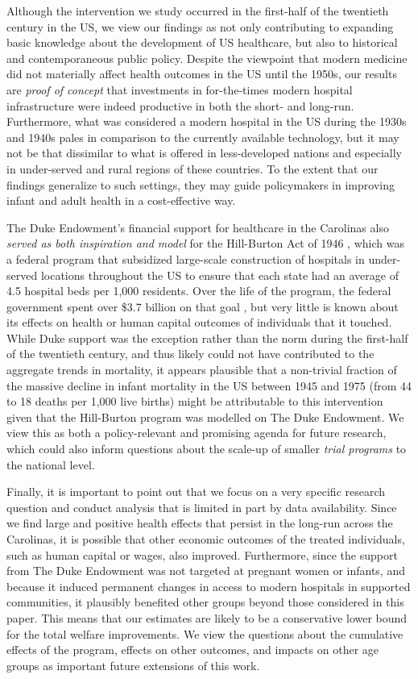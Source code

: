 \documentclass[12pt]{article}
\begin{document}
Although the intervention we study occurred in the first-half of the twentieth century in the US, we view our findings as not only contributing to expanding basic knowledge about the development of US healthcare, but also to historical and contemporaneous public policy.
Despite the viewpoint that modern medicine did not materially affect health outcomes in the US until the 1950s, our results are \emph{proof of concept} that investments in for-the-times modern hospital infrastructure were indeed productive in both the short- and long-run.
Furthermore, what was considered a modern hospital in the US during the 1930s and 1940s pales in comparison to the currently available technology, but it may not be that dissimilar to what is offered in less-developed nations and especially in under-served and rural regions of these countries.
To the extent that our findings generalize to such settings, they may guide policymakers in improving infant and adult health in a cost-effective way.

The Duke Endowment's financial support for healthcare in the Carolinas also \emph{served as both inspiration and model} for the Hill-Burton Act of 1946 , which was a federal program that subsidized large-scale construction of hospitals in under-served locations throughout the US to ensure that each state had an average of 4.5 hospital beds per 1,000 residents.
Over the life of the program, the federal government spent over \$3.7 billion on that goal , but very little is known about its effects on health or human capital outcomes of individuals that it touched.
While Duke support was the exception rather than the norm during the first-half of the twentieth century, and thus likely could not have contributed to the aggregate trends in mortality, it appears plausible that a non-trivial fraction of the massive decline in infant mortality in the US between 1945 and 1975 (from 44 to 18 deaths per 1,000 live births) might be attributable to this intervention given that the Hill-Burton program was modelled on The Duke Endowment.
We view this as both a policy-relevant and promising agenda for future research, which could also inform questions about the scale-up of smaller \emph{trial programs} to the national level.

Finally, it is important to point out that we focus on a very specific research question and conduct analysis that is limited in part by data availability. 
Since we find large and positive health effects that persist in the long-run across the Carolinas, it is possible that other economic outcomes of the treated individuals, such as human capital or wages, also improved. 
Furthermore, since the support from The Duke Endowment was not targeted at pregnant women or infants, and because it induced permanent changes in access to modern hospitals in supported communities, it plausibly benefited other groups beyond those considered in this paper. This means that our estimates are likely to be a conservative lower bound for the total welfare improvements. 
We view the questions about the cumulative effects of the program, effects on other outcomes, and impacts on other age groups as important future extensions of this work.
\end{document}
